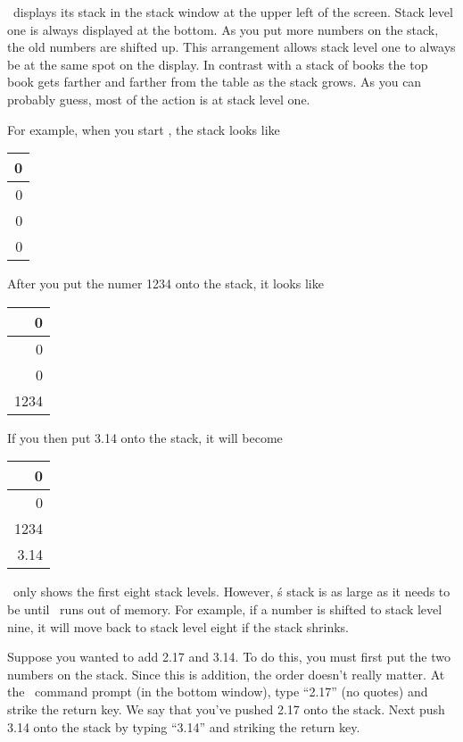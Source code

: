 \documentclass{report}
\begin{document}
\CLAC\ displays its stack in the stack window at the upper left of the screen. Stack level one
is always displayed at the bottom. As you put more numbers on the stack, the old numbers are
shifted up. This arrangement allows stack level one to always be at the same spot on the
display. In contrast with a stack of books the top book gets farther and farther from the table
as the stack grows. As you can probably guess, most of the action is at stack level one.

For example, when you start \CLAC, the stack looks like

\begin{tabular}{|r|} \hline
 0 \\ \hline
 0 \\ \hline
 0 \\ \hline
 0 \\ \hline
\end{tabular}

After you put the numer 1234 onto the stack, it looks like

\begin{tabular}{|r|} \hline
    0 \\ \hline
    0 \\ \hline
    0 \\ \hline
 1234 \\ \hline
\end{tabular}

If you then put 3.14 onto the stack, it will become

\begin{tabular}{|r|} \hline
    0 \\ \hline
    0 \\ \hline
 1234 \\ \hline
 3.14 \\ \hline
\end{tabular}


\CLAC\ only shows the first eight stack levels. However, \CLAC\'s stack is as large as it needs
to be until \CLAC\ runs out of memory. For example, if a number is shifted to stack level nine,
it will move back to stack level eight if the stack shrinks.

Suppose you wanted to add 2.17 and 3.14. To do this, you must first put the two numbers on the
stack. Since this is addition, the order doesn't really matter. At the \CLAC\ command prompt (in
the bottom window), type ``2.17'' (no quotes) and strike the return key. We say that you've
pushed 2.17 onto the stack. Next push 3.14 onto the stack by typing ``3.14'' and striking the
return key.
\end{document}
